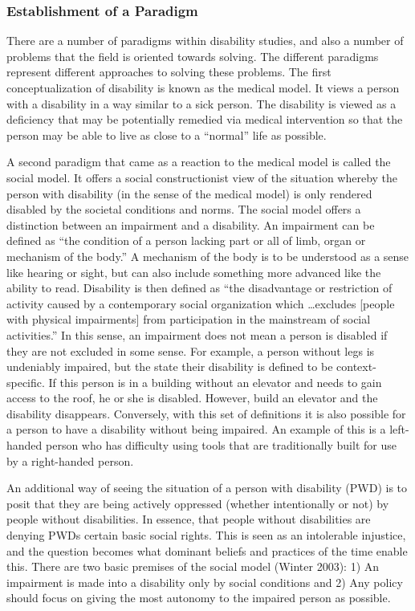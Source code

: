 \documentclass[a4paper]{article}
\begin{document}
\subsubsection{Establishment of a Paradigm}

There are a number of paradigms within disability studies, and also a number
of problems that the field is oriented towards solving. The different
paradigms represent different approaches to solving these problems. The first
conceptualization of disability is known as the medical model. It views a
person with a disability in a way similar to a sick person. The disability is
viewed as a deficiency that may be potentially remedied via medical
intervention so that the person may be able to live as close to a ``normal''
life as possible. 

A second paradigm that came as a reaction to the medical model is called the
social model. It offers a social constructionist view of the situation whereby
the person with disability (in the sense of the medical model) is only
rendered  disabled by the societal conditions and norms. The social model
offers a distinction between an impairment and a disability. An impairment can
be defined as ``the condition of a person lacking part or all of limb, organ
or mechanism of the body.'' A mechanism of the body is to be understood as a
sense like hearing or sight, but can also include something more advanced like
the ability to read. Disability is then defined as ``the disadvantage or
restriction of activity caused by a contemporary social organization which
\ldots excludes [people with physical impairments] from participation in the
mainstream of social activities.'' In this sense, an impairment does not mean a
person is disabled if they are not excluded in some sense. For example, a
person without legs is undeniably impaired, but the state their disability is
defined to be context-specific. If this person is in a building without an
elevator and needs to gain access to the roof, he or she is disabled. However,
build an elevator and the disability disappears. Conversely, with this set of
definitions it is also possible for a person to have a disability without
being impaired. An example of this is a left-handed person who has difficulty
using tools that are traditionally built for use by a right-handed person.

An additional way of seeing the situation of a person with disability (PWD) is
to posit that they are being actively oppressed (whether intentionally or not)
by people without disabilities. In essence, that people without disabilities
are denying PWDs certain basic social rights. This is seen as an intolerable
injustice, and the question becomes what dominant beliefs and practices of the
time enable this. There are two basic premises of the social model (Winter
2003): 1) An impairment is made into a disability only by social conditions
and 2) Any policy should focus on giving the most autonomy to the impaired
person as possible.  
\end{document}
